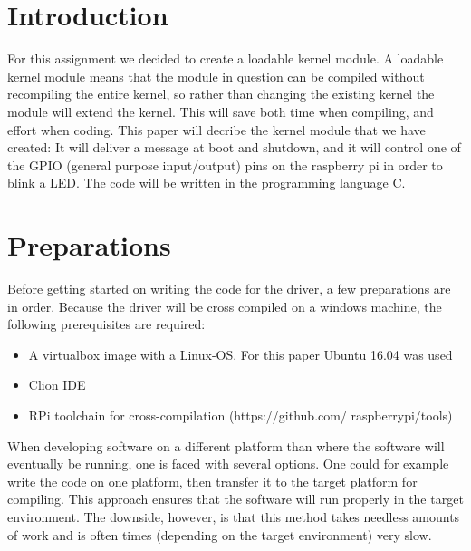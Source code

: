 \documentclass[
10pt, %
a4paper, %
oneside, %
headinclude,footinclude, %
BCOR5mm, %
]{scrartcl}
\begin{document}

\section{Introduction}

For this assignment we decided to create a loadable kernel module. A loadable kernel module means that the module in question can be compiled without recompiling the entire kernel, so rather than changing the existing kernel the module will extend the kernel. This will save both time when compiling, and effort when coding. This paper will decribe the kernel module that we have created: It will deliver a message at boot and shutdown, and it will control one of the GPIO (general purpose input/output) pins on the raspberry pi in order to blink a LED. The code will be written in the programming language C.
 

\section{Preparations}

Before getting started on writing the code for the driver, a few preparations are in order. Because the driver will be cross compiled on a windows machine, the following prerequisites are required:

\begin{itemize}
	\item A virtualbox image with a Linux-OS. For this paper Ubuntu 16.04 was used
	\item Clion IDE
	\item RPi toolchain for cross-compilation (https://github.com/
raspberrypi/tools)
\end{itemize}

When developing software on a different platform than where the software will eventually be running, one is faced with several options. One could for example write the code on one platform, then transfer it to the target platform for compiling. This approach ensures that the software will run properly in the target environment. The downside, however, is that this method takes needless amounts of work and is often times (depending on the target environment) very slow.
\end{document}
